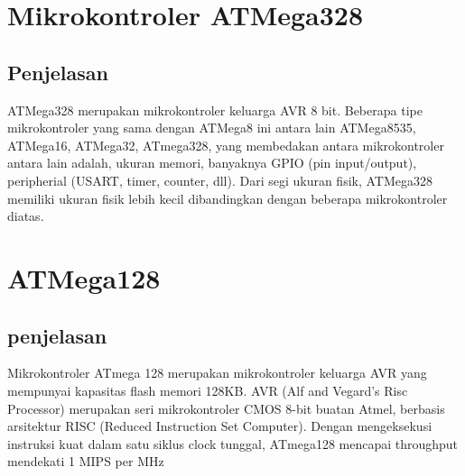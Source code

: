 \section{Mikrokontroler ATMega328}
	\subsection{Penjelasan}
	ATMega328 merupakan mikrokontroler keluarga AVR 8 bit. Beberapa tipe mikrokontroler yang sama dengan ATMega8 ini antara lain ATMega8535, ATMega16, ATMega32, ATmega328, yang membedakan antara mikrokontroler antara lain adalah, ukuran memori, banyaknya GPIO (pin input/output), peripherial (USART, timer, counter, dll). Dari segi ukuran fisik, ATMega328 memiliki ukuran fisik lebih kecil dibandingkan dengan beberapa mikrokontroler diatas.
	
\section{ATMega128}
	\subsection{penjelasan}
	Mikrokontroler ATmega 128 merupakan mikrokontroler keluarga AVR yang mempunyai kapasitas flash memori 128KB. AVR (Alf and Vegard’s Risc Processor) merupakan seri mikrokontroler CMOS 8-bit buatan Atmel, berbasis arsitektur RISC (Reduced Instruction Set Computer). Dengan mengeksekusi instruksi kuat dalam satu siklus clock tunggal, ATmega128 mencapai throughput mendekati 1 MIPS per MHz 